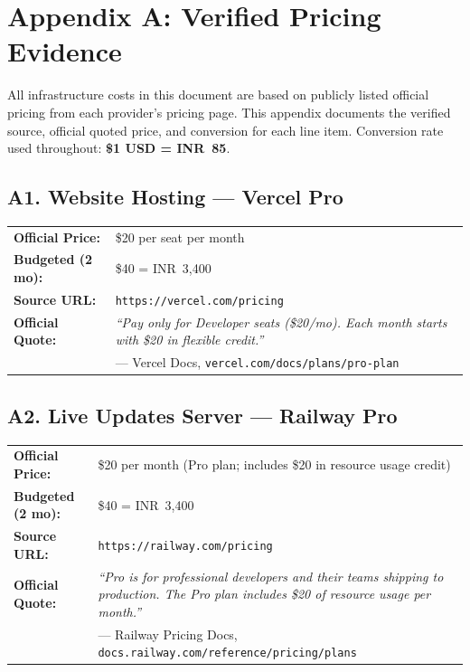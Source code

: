 \documentclass[11pt, a4paper]{article}
\begin{document}
\newpage
\section*{Appendix A: Verified Pricing Evidence}

All infrastructure costs in this document are based on publicly listed official pricing from each provider's pricing page. This appendix documents the verified source, official quoted price, and conversion for each line item. Conversion rate used throughout: \textbf{\$1 USD = INR~85}.

\subsection*{A1. Website Hosting --- Vercel Pro}

\begin{tcolorbox}[greenbox, title={Vercel Pro Plan --- Official Pricing}]
\begin{tabularx}{\linewidth}{@{}>{\bfseries}l X@{}}
Official Price:  & \$20 per seat per month \\
Budgeted (2 mo): & \$40 = INR~3,400 \\
Source URL:      & \texttt{https://vercel.com/pricing} \\
Official Quote:  & \textit{``Pay only for Developer seats (\$20/mo). Each month starts with \$20 in flexible credit.''} \\
                 & --- Vercel Docs, \texttt{vercel.com/docs/plans/pro-plan} \\
\end{tabularx}
\end{tcolorbox}

\subsection*{A2. Live Updates Server --- Railway Pro}

\begin{tcolorbox}[greenbox, title={Railway Pro Plan --- Official Pricing}]
\begin{tabularx}{\linewidth}{@{}>{\bfseries}l X@{}}
Official Price:  & \$20 per month (Pro plan; includes \$20 in resource usage credit) \\
Budgeted (2 mo): & \$40 = INR~3,400 \\
Source URL:      & \texttt{https://railway.com/pricing} \\
Official Quote:  & \textit{``Pro is for professional developers and their teams shipping to production. The Pro plan includes \$20 of resource usage per month.''} \\
                 & --- Railway Pricing Docs, \texttt{docs.railway.com/reference/pricing/plans} \\
\end{tabularx}
\end{tcolorbox}
\end{document}
